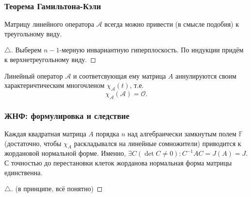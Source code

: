 \subsubsection{Теорема Гамильтона-Кэли}
\begin{to_thr} 
    Матрицу линейного оператора $\mathcal A$ всегда можно привести (в смысле подобия) к треугольному виду. 
\end{to_thr}

\begin{proof}[$\triangle$]
    Выберем $n-1$-мерную инвариантную гиперплоскость. По индукции придём к верхнетреугольному виду.
\end{proof}

\begin{to_thr}
     Линейный оператор $\mathcal A$ и соответсвующая ему матрица $A$ аннулируются своим характеричтическим многочленом $\chi_{\mathcal A} (t)$, т.е.
     $$
         \chi_{\mathcal A} (\mathcal A) = \mathcal O.
     $$
\end{to_thr}


\subsubsection{ЖНФ: формулировка и следствие}
\begin{to_thr} 
    Каждая квадратная матрица $A$ порядка $n$ над алгебраически замкнутым полем $\mathbb{F}$ (достаточно, чтобы $\chi_{A}$ раскладывался на линейные сомножители) приводится к жордановой нормальной форме. Именно, $\exists C (\det C \neq 0) \colon C^{-1} A C = J(A) = J$. С точностью до перестановки клеток жорданова нормальная форма матрицы единственна. 
\end{to_thr}

  \begin{proof}[$\triangle$]
      \koz \hspace{1cm} \koz \hspace{1cm} \koz \hspace{1cm} \koz \hspace{1cm} \koz \hspace{1cm} (в принципе, всё понятно) \hspace{1cm} \koz \hspace{1cm} \koz \hspace{1cm} \koz
  \end{proof}


